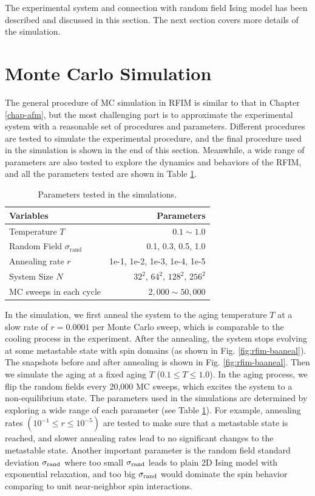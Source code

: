 The experimental system and connection with random field Ising model has been described and discussed in this section. The next section covers more details of the simulation.


\section{Monte Carlo Simulation}
The general procedure of MC simulation in RFIM is similar to that in Chapter \ref{chap-afm}, but the most challenging part is to approximate the experimental system with a reasonable set of procedures and parameters. Different procedures are tested to simulate the experimental procedure, and the final procedure used in the simulation is shown in the end of this section. Meanwhile, a wide range of parameters are also tested to explore the dynamics and behaviors of the RFIM, and all the parameters tested are shown in Table \ref{table:rfim-paras}. 

\begin{table}[h!]
\begin{center}
\begin{tabular}{l | r}
Variables              & Parameters \\
\hline
Temperature $T$ 	& 	$0.1 \sim 1.0$   \\
Random Field $\sigma_\text{rand}$            &		 0.1, 0.3, 0.5, 1.0   \\
Annealing rate $r$          & 	1e-1, 1e-2, 1e-3, 1e-4, 1e-5   \\
System Size $N$ 	&	  $32^2$, $64^2$, $128^2$, $256^2$   \\
MC sweeps in each cycle  	&	  $2,000 \sim 50,000$   \\
\end{tabular}
\end{center}
\caption{Parameters tested in the simulations.}
\label{table:rfim-paras}
\end{table}

In the simulation, we first anneal the system to the aging temperature $T$ at a slow rate of $r=0.0001$ per Monte Carlo sweep, which is comparable to the cooling process in the experiment. After the annealing, the system stops evolving at some metastable state with spin domains (as shown in Fig. \ref{fig:rfim-baaneal}). The snapshots before and after annealing is shown in Fig. \ref{fig:rfim-baaneal}. Then we simulate the aging at a fixed aging $T$ ($0.1\le T \le 1.0$). In the aging process, we flip the random fields every 20,000 MC sweeps, which excites the system to a non-equilibrium state. The parameters used in the simulations are determined by exploring a wide range of each parameter (see Table \ref{table:rfim-paras}). For example, annealing rates $\left( 10^{-1} \le r \le 10^{-5}\right)$ are tested to make sure that a metastable state is reached, and slower annealing rates lead to no significant changes to the metastable state. Another important parameter is the random field standard deviation $\sigma_{\rm rand}$ where too small $\sigma_{\rm rand}$ leads to plain 2D Ising model with exponential relaxation, and too big $\sigma_{\rm rand}$ would dominate the spin behavior comparing to unit near-neighbor spin interactions. 


